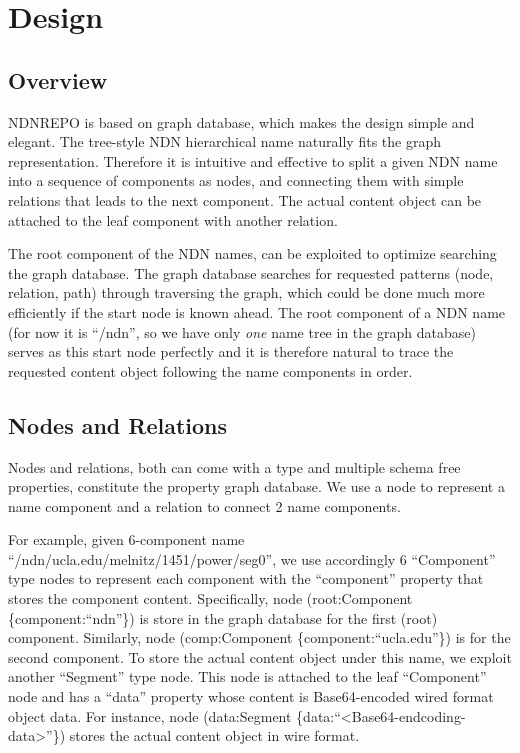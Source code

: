 \section{Design}

\subsection{Overview}

NDNREPO is based on graph database, which makes the design simple and elegant. The tree-style NDN hierarchical name naturally fits the graph representation. Therefore it is intuitive and effective to split a given NDN name into a sequence of components as nodes, and connecting them with simple relations that leads to the next component. The actual content object can be attached to the leaf component with another relation.

The root component of the NDN names, can be exploited to optimize searching the graph database. The graph database searches for requested patterns (node, relation, path) through traversing the graph, which could be done much more efficiently if the start node is known ahead. The root component of a NDN name (for now it is ``/ndn'', so we have only \emph{one} name tree in the graph database) serves as this start node perfectly and it is therefore natural to trace the requested content object following the name components in order.

\subsection{Nodes and Relations}

Nodes and relations, both can come with a type and multiple schema free properties, constitute the property graph database. We use a node to represent a name component and a relation to connect 2 name components.

For example, given 6-component name ``/ndn/ucla.edu/melnitz/1451/power/seg0'', we use accordingly 6 ``Component'' type nodes to represent each component with the ``component'' property that stores the component content. Specifically, node (root:Component \{component:``ndn''\}) is store in the graph database for the first (root) component. Similarly, node (comp:Component \{component:``ucla.edu''\}) is for the second component. To store the actual content object under this name, we exploit another ``Segment'' type node. This node is attached to the leaf ``Component'' node and has a ``data'' property whose content is Base64-encoded wired format object data. For instance, node (data:Segment \{data:``<Base64-endcoding-data>''\}) stores the actual content object in wire format.


